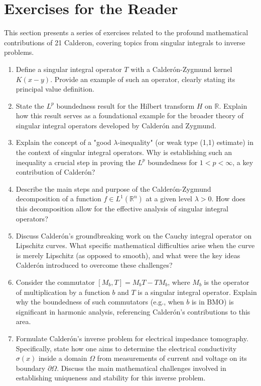 \section*{Exercises for the Reader}
This section presents a series of exercises related to the profound mathematical contributions of 21 Calderon, covering topics from singular integrals to inverse problems.

\begin{enumerate}
    \item [B] Define a singular integral operator $T$ with a Calderón-Zygmund kernel $K(x-y)$. Provide an example of such an operator, clearly stating its principal value definition.
    \item [B] State the $L^p$ boundedness result for the Hilbert transform $H$ on $\mathbb{R}$. Explain how this result serves as a foundational example for the broader theory of singular integral operators developed by Calderón and Zygmund.
    \item [B] Explain the concept of a "good $\lambda$-inequality" (or weak type (1,1) estimate) in the context of singular integral operators. Why is establishing such an inequality a crucial step in proving the $L^p$ boundedness for $1 < p < \infty$, a key contribution of Calderón?
    \item [I] Describe the main steps and purpose of the Calderón-Zygmund decomposition of a function $f \in L^1(\mathbb{R}^n)$ at a given level $\lambda > 0$. How does this decomposition allow for the effective analysis of singular integral operators?
    \item [I] Discuss Calderón's groundbreaking work on the Cauchy integral operator on Lipschitz curves. What specific mathematical difficulties arise when the curve is merely Lipschitz (as opposed to smooth), and what were the key ideas Calderón introduced to overcome these challenges?
    \item [I] Consider the commutator $[M_b, T] = M_b T - T M_b$, where $M_b$ is the operator of multiplication by a function $b$ and $T$ is a singular integral operator. Explain why the boundedness of such commutators (e.g., when $b$ is in BMO) is significant in harmonic analysis, referencing Calderón's contributions to this area.
    \item [A] Formulate Calderón's inverse problem for electrical impedance tomography. Specifically, state how one aims to determine the electrical conductivity $\sigma(x)$ inside a domain $\Omega$ from measurements of current and voltage on its boundary $\partial\Omega$. Discuss the main mathematical challenges involved in establishing uniqueness and stability for this inverse problem.
\end{enumerate}

